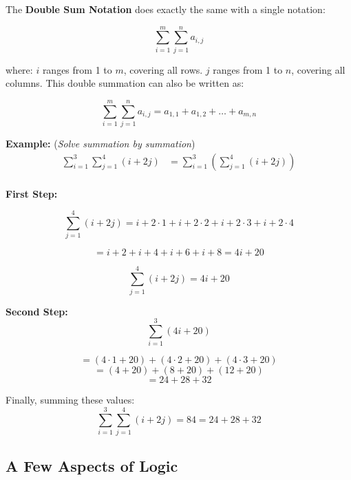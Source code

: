 \documentclass{article}
\begin{document}
The \textbf{Double Sum Notation} does exactly the same with a single notation: 

\[
\sum_{i=1}^m \sum_{j=1}^n a_{i,j}
\]

where:
\(i\) ranges from 1 to \(m\), covering all rows.
\(j\) ranges from 1 to \(n\), covering all columns. This double summation can also be written as:

\[
\sum_{i=1}^m \sum_{j=1}^n a_{i,j} = a_{1,1} + a_{1,2} + \dots + a_{m,n}
\]

\textbf{Example: }(\textit{Solve summation by summation})
\begin{align*}
\sum_{i=1}^{3} \sum_{j=1}^{4} (i + 2j) &= \sum_{i=1}^{3} \left( \sum_{j=1}^{4} (i + 2j) \right) \\
\end{align*}

\textbf{First Step:}

\[
\sum_{j=1}^{4} (i + 2j) = i + 2 \cdot 1 + i + 2 \cdot 2 + i + 2 \cdot 3 + i + 2 \cdot 4
\]

\[
= i + 2 + i + 4 + i + 6 + i + 8 = 4i + 20
\]

\[
\sum_{j=1}^{4} (i + 2j) = 4i + 20
\]

\textbf{Second Step:}
\[
\sum_{i=1}^{3} (4i + 20)
\]

\[
= (4 \cdot 1 + 20) + (4 \cdot 2 + 20) + (4 \cdot 3 + 20)
\]
\[
= (4 + 20) + (8 + 20) + (12 + 20)
\]
\[
= 24 + 28 + 32
\]

Finally, summing these values:
\[
\sum_{i=1}^{3} \sum_{j=1}^{4} (i + 2j) = 84 = 24 + 28 + 32 
\]

\subsection{A Few Aspects of Logic}
\end{document}
